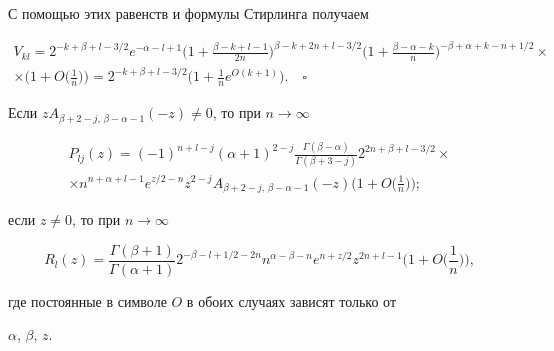 С помощью этих равенств и формулы Стирлинга получаем 


\begin{multline*} 


V_{kl}=2^{-k+\beta+l-3/2}e^{-\alpha-l+1} 


\bigg(1+\frac{\beta-k+l-1}{2n} 


\bigg)^{\beta-k+2n+l-3/2}\bigg(1+\frac{\beta-\alpha-k}{n} 


\bigg)^{-\beta+\alpha+k-n+1/2}\times \\ 


% 


\times\bigg(1+O\bigg(\frac{1}{n} \bigg) \bigg) 


=2^{-k+\beta+l-3/2}\bigg(1+\frac{1}{n} 


e^{O(k+1)}\bigg).\quad\square 


\end{multline*} 


 


\begin{lem} 


Если $z A_{\beta+2-j,\,\beta-\alpha-1}(-z)\ne0$, то при $n\to\infty$ 


\begin{multline} 


P_{lj}(z)=(-1)^{n+l-j}(\alpha+1)^{2-j} 


\frac{\Gamma(\beta-\alpha)}{\Gamma(\beta+3-j)} 


2^{2n+\beta+l-3/2}\times \\


%


\times n^{n+\alpha+l-1}e^{z/2-n}z^{2-j} 


A_{\beta+2-j,\,\beta-\alpha-1}(-z) 


\bigg(1+O\bigg(\frac{1}{n} \bigg) \bigg); 


\end{multline} 


если $z\ne0$, то при $n\to\infty$ 


\begin{equation} 


R_l(z)=\frac{\Gamma(\beta+1)}{\Gamma(\alpha+1)} 


2^{-\beta-l+1/2-2n}n^{\alpha-\beta-n}e^{n+z/2} 


z^{2n+l-1}\bigg(1+O\bigg(\frac{1}{n} \bigg) \bigg), 


\end{equation} 


где постоянные в символе $O$ в обоих случаях зависят только от 


$\alpha$, $\beta$, $z$. 


\end{lem} 


